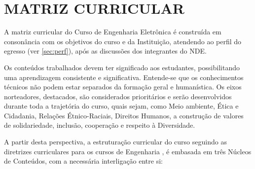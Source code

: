 



\section{MATRIZ CURRICULAR}
\label{sec:matriz}

A matriz curricular do Curso de Engenharia Eletrônica é construída em consonância com os objetivos do curso e da Instituição, atendendo ao perfil do egresso (ver \autoref{sec:perf}), após as discussões dos integrantes do NDE.

Os conteúdos trabalhados devem ter significado aos estudantes, possibilitando uma aprendizagem consistente e significativa. Entende-se que os conhecimentos técnicos não podem estar separados da formação geral e humanística. Os eixos norteadores, destacados, são considerados prioritários e serão desenvolvidos durante toda a trajetória do curso, quais sejam, como Meio ambiente, Ética e Cidadania, Relações Étnico-Raciais, Direitos Humanos, a construção de valores de solidariedade, inclusão, cooperação e respeito à Diversidade.

A partir desta perspectiva, a estruturação curricular do curso seguindo as diretrizes curriculares para os cursos de Engenharia \cite{dcneng}, é embasada em três Núcleos de Conteúdos, com a necessária interligação entre si:

